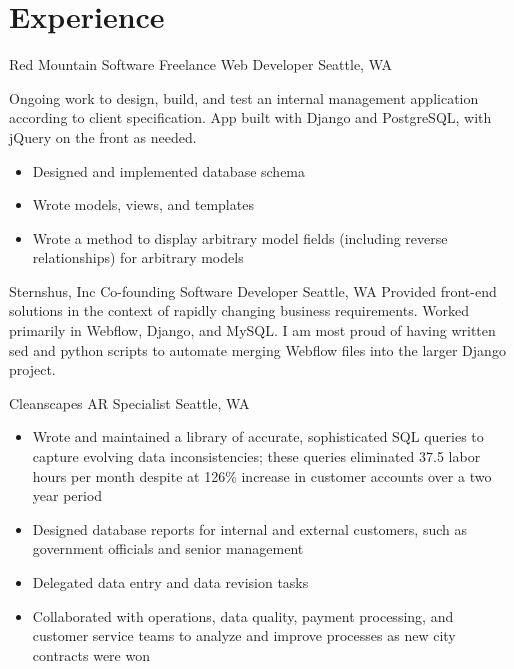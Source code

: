 \documentclass[10pt,a4paper,sans]{moderncv}        %
\begin{document}
\section{Experience}

\begin{comment}
  \cventry
  {date - date}
  {Employer}
  {Job Title}
  {}
  {City, State}
  {Description of work
    \begin{itemize}
    \item specific achievement
    \item specific achievement
    \end{itemize}}
\end{comment}

 {Red Mountain Software} {Freelance Web Developer} {} {Seattle, WA} {Ongoing work to design, build, and test an internal management application according to client specification. App built with Django and PostgreSQL, with jQuery on the front as needed.
  \begin{itemize}
  \item Designed and implemented database schema
  \item Wrote models, views, and templates
  \item Wrote a method to display arbitrary model fields (including reverse relationships) for arbitrary models
  \end{itemize}}

 {Sternshus, Inc} {Co-founding Software Developer} {} {Seattle, WA} {Provided front-end solutions in the context of rapidly changing business requirements. Worked primarily in Webflow, Django, and MySQL. I am most proud of having written sed and python scripts to automate merging Webflow files into the larger Django project.}

 {Cleanscapes} {AR Specialist} {} {Seattle, WA} {
  \begin{itemize}
  \item Wrote and maintained a library of accurate, sophisticated SQL queries to capture evolving data inconsistencies; these queries eliminated 37.5 labor hours per month despite at 126\% increase in customer accounts over a two year period
  \item Designed database reports for internal and external customers, such as government officials and senior management
  \item Delegated data entry and data revision tasks
  \item Collaborated with operations, data quality, payment processing, and customer service teams to analyze and improve processes as new city contracts were won
  \end{itemize}}
\end{document}
